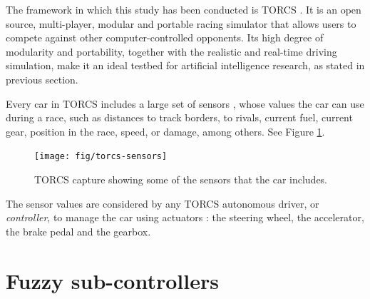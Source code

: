 \documentclass[10pt,journal,compsoc]{IEEEtran}
\begin{document}
The framework in which this study has been conducted is TORCS \cite{torcs4}. It is an open source, multi-player, modular and portable racing simulator that allows users to compete against other computer-controlled opponents.
Its high degree of modularity and portability, together with the
realistic and real-time driving simulation, make it an ideal testbed
for artificial intelligence research, as stated in previous section.

Every car in TORCS includes  a large set of sensors \cite{manualTORCS},
whose values the car can use during a race, such as distances to track borders, to rivals, current fuel, current gear, position in the race, speed, or damage, among others. See Figure \ref{fig:torcs-sensors}.

\begin{figure}[!ht] 
	\begin{center}
		\texttt{[image: fig/torcs-sensors]}
		\caption {TORCS capture showing some of the sensors that the car includes.}
		\label{fig:torcs-sensors}
	\end{center}
\end{figure}


The sensor values are considered by any TORCS autonomous driver, or
{\em controller}, to manage the car using actuators \cite{manualTORCS}: the
steering wheel, the accelerator, the brake pedal and the gearbox.   



\section{Fuzzy sub-controllers}
\label{sec:subcontrollers}



\end{document}
